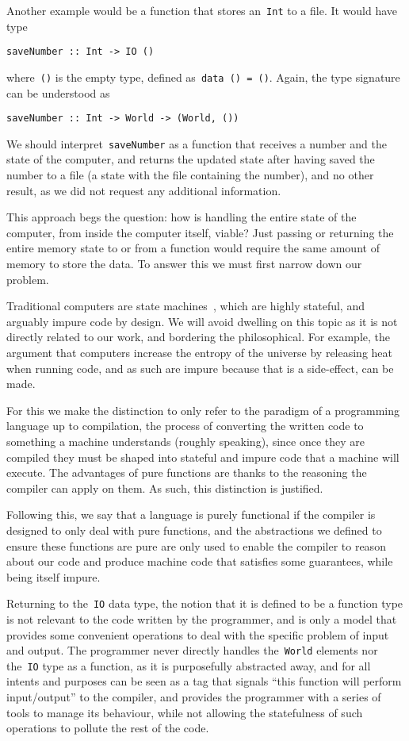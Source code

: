 \documentclass[../TFG.tex]{subfiles}
\begin{document}
Another example would be a function that stores an~\texttt{Int} to
a file. It would have type
\begin{verbatim}
saveNumber :: Int -> IO ()
\end{verbatim}
where~\texttt{()} is the empty type, defined
as~\texttt{data () = ()}. Again, the type signature can be
understood as
\begin{verbatim}
saveNumber :: Int -> World -> (World, ())
\end{verbatim}
We should interpret~\texttt{saveNumber} as a function that receives
a number and the state of the computer, and returns the updated state after
having saved the number to a file (a state with the file containing the number),
and no other result, as we did not request any additional information.

This approach begs the question: how is handling the entire state of the
computer, from inside the computer itself, viable? Just passing or returning the
entire memory state to or from a function would require the same amount of
memory to store the data. To answer this we must first narrow down our problem.

Traditional computers are state machines~\cite{myers-state-machines}, which are
highly stateful, and arguably impure code by design. We will avoid dwelling on
this topic as it is not directly related to our work, and bordering the
philosophical. For example, the argument that computers increase the entropy of
the universe by releasing heat when running code, and as such are impure because
that is a side-effect, can be made.

For this we make the distinction to only refer to the paradigm of a programming
language up to compilation, the process of converting the written code to
something a machine understands (roughly speaking), since once they are compiled
they must be shaped into stateful and impure code that a machine will execute.
The advantages of pure functions are thanks to the reasoning the compiler can
apply on them. As such, this distinction is justified.

Following this, we say that a language is purely functional if the compiler is
designed to only deal with pure functions, and the abstractions we defined to
ensure these functions are pure are only used to enable the compiler to reason
about our code and produce machine code that satisfies some guarantees, while
being itself impure.

Returning to the~\texttt{IO} data type, the notion that it is
defined to be a function type is not relevant to the code written by the
programmer, and is only a model that provides some convenient operations to deal
with the specific problem of input and output. The programmer never directly
handles the~\texttt{World} elements nor
the~\texttt{IO} type as a function, as it is purposefully
abstracted away, and for all intents and purposes can be seen as a tag that
signals ``this function will perform input/output'' to the compiler, and
provides the programmer with a series of tools to manage its behaviour, while
not allowing the statefulness of such operations to pollute the rest of the
code.
\end{document}
